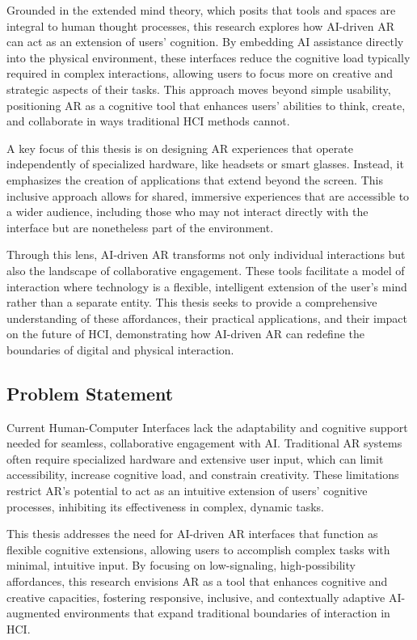 Grounded in the extended mind theory\cite{andy1998extended}, which posits that tools and spaces are integral to human thought processes, this research explores how AI-driven AR can act as an extension of users’ cognition.
By embedding AI assistance directly into the physical environment, these interfaces reduce the cognitive load typically required in complex interactions, allowing users to focus more on creative and strategic aspects of their tasks.
This approach moves beyond simple usability, positioning AR as a cognitive tool that enhances users' abilities to think, create, and collaborate in ways traditional HCI methods cannot.

A key focus of this thesis is on designing AR experiences that operate independently of specialized hardware, like headsets or smart glasses.
Instead, it emphasizes the creation of applications that extend beyond the screen.
This inclusive approach allows for shared, immersive experiences that are accessible to a wider audience, including those who may not interact directly with the interface but are nonetheless part of the environment.

Through this lens, AI-driven AR transforms not only individual interactions but also the landscape of collaborative engagement.
These tools facilitate a model of interaction where technology is a flexible, intelligent extension of the user's mind rather than a separate entity.
This thesis seeks to provide a comprehensive understanding of these affordances, their practical applications, and their impact on the future of HCI, demonstrating how AI-driven AR can redefine the boundaries of digital and physical interaction.

\subsection{Problem Statement}

Current Human-Computer Interfaces lack the adaptability and cognitive support needed for seamless, collaborative engagement with AI.
Traditional AR systems often require specialized hardware and extensive user input, which can limit accessibility, increase cognitive load, and constrain creativity.
These limitations restrict AR’s potential to act as an intuitive extension of users' cognitive processes, inhibiting its effectiveness in complex, dynamic tasks.

This thesis addresses the need for AI-driven AR interfaces that function as flexible cognitive extensions, allowing users to accomplish complex tasks with minimal, intuitive input.
By focusing on low-signaling, high-possibility affordances, this research envisions AR as a tool that enhances cognitive and creative capacities, fostering responsive, inclusive, and contextually adaptive AI-augmented environments that expand traditional boundaries of interaction in HCI.


